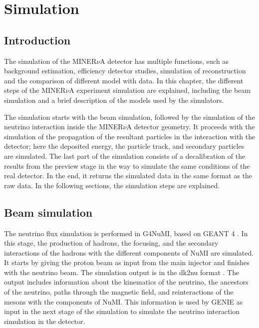 \chapter{Simulation}
\minitoc
\label{Cap:Simulation}

\section{Introduction}
\label{Cap:Simulation:Introduction}
The simulation of the MINER$\nu$A detector has multiple functions, such as background estimation, efficiency detector studies, simulation of reconstruction and the comparison of different  model with data. In this chapter, the different steps of the MINER$\nu$A experiment simulation are explained, including the beam simulation and a brief description of the models used by the simulators.

The simulation starts with the beam simulation, followed by the simulation of the neutrino interaction inside the MINER$\nu$A detector geometry. It proceeds with the simulation of the propagation of the resultant particles in the interaction with the detector; here the deposited energy, the particle track, and secondary particles are simulated. The last part of the simulation consists of a decalibration of the results from the preview stage in the way to simulate the same conditions of the real detector. In the end, it returns the simulated data in the same format as the raw data. In the following sections, the simulation steps are explained.

\section{Beam simulation}
\label{Cap:Simulation:BeamSimulation}

The neutrino flux simulation is performed in G4NuMI, based on GEANT 4 \cite{GEANT4}. In this stage, the production of hadrons, the focusing, and the secondary interactions of the hadrons with the different components of NuMI are simulated. It starts by giving the proton beam as input from the main injector and finishes with the neutrino beam. The simulation output is in the dk2nu format \cite{dk2nu}. The output includes information about the kinematics of the neutrino, the ancestors of the neutrino, paths through the magnetic field, and reinteractions of the mesons with the components of NuMI. This information is used by GENIE\cite{Genie} as input in the next stage of the simulation to simulate the neutrino interaction simulation in the detector.
 
